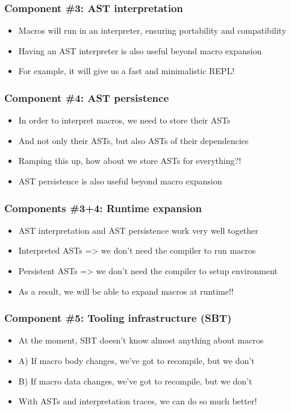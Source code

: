 \documentclass[svgnames,dvipsnames,hyperref={bookmarks=false}]{beamer}
\begin{document}
\begin{frame}[fragile]
\frametitle{Component \#3: AST interpretation}

\begin{itemize}
\item Macros will run in an interpreter, ensuring portability and compatibility
\item Having an AST interpreter is also useful beyond macro expansion
\item For example, it will give us a fast and minimalistic REPL!
\end{itemize}
\end{frame}

\begin{frame}[fragile]
\frametitle{Component \#4: AST persistence}

\begin{itemize}
\item In order to interpret macros, we need to store their ASTs
\item And not only their ASTs, but also ASTs of their dependencies
\item Ramping this up, how about we store ASTs for everything?!
\item AST persistence is also useful beyond macro expansion
\end{itemize}
\end{frame}

\begin{frame}[fragile]
\frametitle{Components \#3+4: Runtime expansion}

\begin{itemize}
\item AST interpretation and AST persistence work very well together
\item Interpreted ASTs => we don't need the compiler to run macros
\item Persistent ASTs => we don't need the compiler to setup environment
\item As a result, we will be able to expand macros at runtime!!
\end{itemize}
\end{frame}

\begin{frame}[fragile]
\frametitle{Component \#5: Tooling infrastructure (SBT)}

\begin{itemize}
\item At the moment, SBT doesn't know almost anything about macros
\item A) If macro body changes, we've got to recompile, but we don't
\item B) If macro data changes, we've got to recompile, but we don't
\item With ASTs and interpretation traces, we can do so much better!
\end{itemize}
\end{frame}
\end{document}
